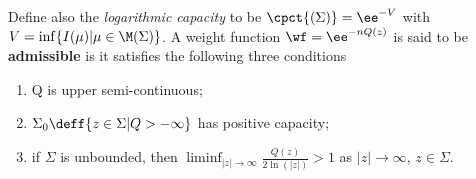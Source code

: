 \begin{definicao}	\label{Definition: Weight Admissibility}
	Define also the \textit{logarithmic capacity} to be	$\cpct{(\Sigma)} = \ee^{-V}$ with $V = \inf\{ I(\mu) | \mu \in \M(\Sigma)\}$. A weight function $\wf = \ee^{-nQ(z)}$ is said to be \textbf{admissible} is it satisfies the following three conditions
	\begin{enumerate}
		\item Q is upper semi-continuous;
		\item $\Sigma_0 \deff \{ z \in \Sigma | Q > -\infty \}$ has positive capacity;
		\item if $\Sigma$ is unbounded, then $\liminf_{|z| \rightarrow \infty } \frac{Q(z)}{2 \ln{(|z|)}} > 1$ as $|z| \rightarrow \infty$, $z \in \Sigma$.
	\end{enumerate} 
\end{definicao}

